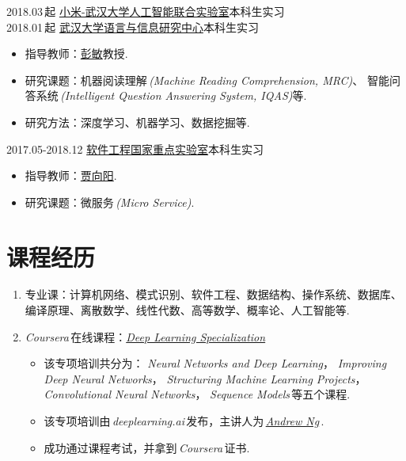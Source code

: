 \documentclass[letterpaper,AutoFakeBold]{twentysecondcv} %
\begin{document}
2018.03\,起 \qquad\qquad \href{http://nisplab.whu.edu.cn/index.html}{小米-武汉大学人工智能联合实验室}\hfill 本科生实习
\\2018.01\,起 \qquad\qquad \href{http://nisplab.whu.edu.cn/index.html}{武汉大学语言与信息研究中心}\hfill 本科生实习
\begin{itemize}
	\item 指导教师：\href{http://iqua.ece.toronto.edu/ychen/}{彭敏}教授.
	\item 研究课题：机器阅读理解\,\emph{(Machine Reading Comprehension, MRC)}、
	智能问答系统\,\emph{(Intelligent Question Answering System, IQAS)}等.
	\item 研究方法：深度学习、机器学习、数据挖掘等.
\end{itemize}
2017.05-2018.12 \qquad \href{http://nisplab.whu.edu.cn/index.html}{软件工程国家重点实验室}\hfill 本科生实习
\begin{itemize}
	\item 指导教师：\href{http://iqua.ece.toronto.edu/ychen/}{贾向阳}.
	\item 研究课题：微服务\,\emph{(Micro Service)}.
\end{itemize}




\section{\large 课程经历}


\begin{enumerate}
	\setlength{\itemsep}{0pt}
	\setlength{\parsep}{0pt}
	\setlength{\parskip}{0pt}
	\item 专业课：计算机网络、模式识别、软件工程、数据结构、操作系统、数据库、编译原理、离散数学、线性代数、高等数学、概率论、人工智能等.
	\item \emph{Coursera\,}在线课程：\href{https://www.coursera.org/specializations/deep-learning}{\emph{Deep Learning Specialization}}
		\begin{itemize}
			\item 该专项培训共分为：
			\emph{Neural Networks and Deep Learning}，
			\emph{Improving Deep Neural Networks}，
			\emph{Structuring Machine Learning Projects}，
			\emph{Convolutional Neural Networks}，
			\emph{Sequence Models}\,等五个课程.
			\item 该专项培训由\,\emph{deeplearning.ai}\,发布，主讲人为\,\href{https://www.coursera.org/instructor/andrewng}{\emph{Andrew Ng}}\,.
			\item 成功通过课程考试，并拿到\,\emph{Coursera}\,证书.
		\end{itemize}
\end{enumerate}
\end{document}
